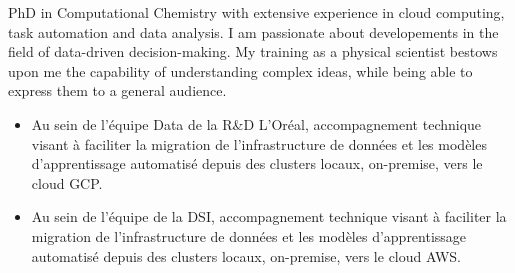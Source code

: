 \documentclass[10pt,a4paper,ragged2e,academicons]{altacv}
\begin{document}

\begin{fullwidth}
\makecvheader
\parbox{.7\paperwidth}{%
PhD in Computational Chemistry with extensive experience in cloud computing, task automation and data analysis. I am passionate about developements in the field of data-driven decision-making. My training as a physical scientist bestows upon me the capability of understanding complex ideas, while being able to express them to a general audience.
}

\end{fullwidth}



\begin{itemize}
\item Au sein de l’équipe Data de la R\&D L’Oréal, accompagnement technique visant à faciliter la migration de l’infrastructure de données et les modèles d’apprentissage automatisé depuis des clusters locaux, on-premise, vers le cloud GCP.
\end{itemize}

\divider

\begin{itemize}
\item Au sein de l’équipe de la DSI, accompagnement technique visant à faciliter la migration
de l’infrastructure de données et les modèles d’apprentissage automatisé depuis des
clusters locaux, on-premise, vers le cloud AWS. 
\end{itemize}
\end{document}
